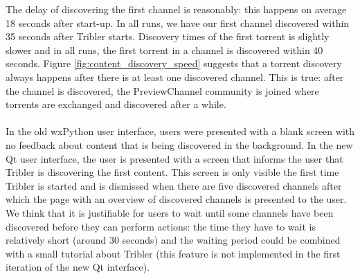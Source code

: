 The delay of discovering the first channel is reasonably: this happens on average 18 seconds after start-up. In all runs, we have our first channel discovered within 35 seconds after Tribler starts. Discovery times of the first torrent is slightly slower and in all runs, the first torrent in a channel is discovered within 40 seconds. Figure \ref{fig:content_discovery_speed} suggests that a torrent discovery always happens after there is at least one discovered channel. This is true: after the channel is discovered, the PreviewChannel community is joined where torrents are exchanged and discovered after a while.\\\\
In the old wxPython user interface, users were presented with a blank screen with no feedback about content that is being discovered in the background. In the new Qt user interface, the user is presented with a screen that informs the user that Tribler is discovering the first content. This screen is only visible the first time Tribler is started and is dismissed when there are five discovered channels after which the page with an overview of discovered channels is presented to the user. We think that it is justifiable for users to wait until some channels have been discovered before they can perform actions: the time they have to wait is relatively short (around 30 seconds) and the waiting period could be combined with a small tutorial about Tribler (this feature is not implemented in the first iteration of the new Qt interface).

